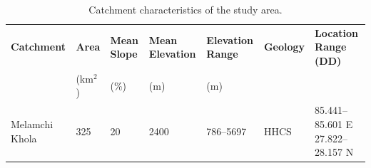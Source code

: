 



\begin{table}[h!]
\centering
\begin{small}
\begin{tabular}{p{3cm} p{1cm} p{1cm} p{1.8cm} p{1.9cm} p{1.5cm} p{3cm}}
       \hline
       \textbf{Catchment} & \textbf{Area} & \textbf{Mean Slope} & \textbf{Mean Elevation} & \textbf{Elevation Range} & \textbf{Geology} & \textbf{Location Range (DD)} \\[4pt]
                          & (km$^2$)    & (\%)                & (m)                     & (m)                      &                &  \\[4pt]
       \hline
       Melamchi Khola     & 325         & 20                  & 2400                    & 786--5697                & HHCS           & 85.441--85.601 E  27.822--28.157 N \\[4pt]
       \hline
\end{tabular}
\end{small}
\caption{Catchment characteristics of the study area.}
\label{tab:catchment_characteristics}
\end{table}



